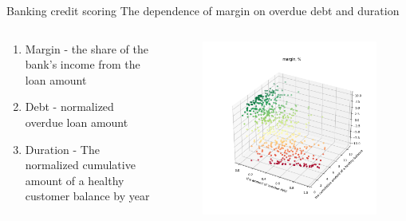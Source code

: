 \documentclass[12pt,pdf,hyperref={unicode}]{beamer}
\begin{document}
\begin{frame}{Banking credit scoring}
The dependence of margin on overdue debt and duration 
\begin{columns}
\begin{column}{0.4\textwidth}
\begin{enumerate}[1)]
    \item Margin - the share of the bank's income from the loan amount 
    \item Debt  - normalized overdue loan amount 
    \item Duration - The normalized cumulative amount of a healthy customer balance by year 
\end{enumerate}
\end{column}
\begin{column}{0.6\textwidth}
\begin{figure}
    \centering
    \includegraphics[width=1\linewidth]{margin.png}

\end{figure}
\end{column}
\end{columns}
\bigskip
\end{frame}
\end{document}
